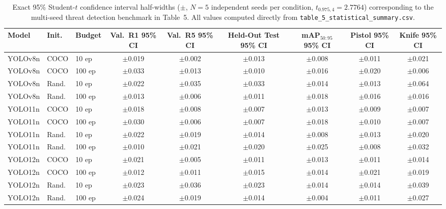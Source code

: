 \begin{table}[hbt!]
\caption{Exact 95\% Student-$t$ confidence interval half-widths ($\pm$, $N=5$ independent seeds per condition, $t_{0.975,4} = 2.7764$) corresponding to the multi-seed threat detection benchmark in Table~5. All values computed directly from \texttt{table\_5\_statistical\_summary.csv}.}%
\label{tab:supp_ci95}
\centering
\scriptsize
\setlength{\tabcolsep}{3.5pt}
\begin{tabular}{lllcccccc}
\toprule
\textbf{Model} & \textbf{Init.} & \textbf{Budget} & \textbf{Val.\ R1 95\% CI} & \textbf{Val.\ R5 95\% CI} & \textbf{Held-Out Test 95\% CI} & \textbf{mAP}$_{50:95}$ \textbf{95\% CI} & \textbf{Pistol 95\% CI} & \textbf{Knife 95\% CI} \\
\midrule
YOLOv8n & COCO & 10 ep & $\pm$0.019 & $\pm$0.002 & $\pm$0.013 & $\pm$0.008 & $\pm$0.011 & $\pm$0.021 \\
YOLOv8n & COCO & 100 ep & $\pm$0.033 & $\pm$0.013 & $\pm$0.010 & $\pm$0.016 & $\pm$0.020 & $\pm$0.006 \\
\midrule
YOLOv8n & Rand. & 10 ep & $\pm$0.022 & $\pm$0.035 & $\pm$0.033 & $\pm$0.014 & $\pm$0.013 & $\pm$0.064 \\
YOLOv8n & Rand. & 100 ep & $\pm$0.013 & $\pm$0.006 & $\pm$0.011 & $\pm$0.018 & $\pm$0.016 & $\pm$0.016 \\
\midrule
YOLO11n & COCO & 10 ep & $\pm$0.018 & $\pm$0.008 & $\pm$0.007 & $\pm$0.013 & $\pm$0.009 & $\pm$0.007 \\
YOLO11n & COCO & 100 ep & $\pm$0.030 & $\pm$0.006 & $\pm$0.007 & $\pm$0.018 & $\pm$0.010 & $\pm$0.007 \\
\midrule
YOLO11n & Rand. & 10 ep & $\pm$0.022 & $\pm$0.019 & $\pm$0.014 & $\pm$0.008 & $\pm$0.013 & $\pm$0.020 \\
YOLO11n & Rand. & 100 ep & $\pm$0.010 & $\pm$0.021 & $\pm$0.020 & $\pm$0.025 & $\pm$0.008 & $\pm$0.032 \\
\midrule
YOLO12n & COCO & 10 ep & $\pm$0.021 & $\pm$0.005 & $\pm$0.011 & $\pm$0.013 & $\pm$0.011 & $\pm$0.014 \\
YOLO12n & COCO & 100 ep & $\pm$0.012 & $\pm$0.011 & $\pm$0.015 & $\pm$0.014 & $\pm$0.021 & $\pm$0.019 \\
\midrule
YOLO12n & Rand. & 10 ep & $\pm$0.023 & $\pm$0.036 & $\pm$0.023 & $\pm$0.014 & $\pm$0.014 & $\pm$0.039 \\
YOLO12n & Rand. & 100 ep & $\pm$0.024 & $\pm$0.019 & $\pm$0.014 & $\pm$0.004 & $\pm$0.011 & $\pm$0.027 \\
\bottomrule
\end{tabular}
\end{table}
